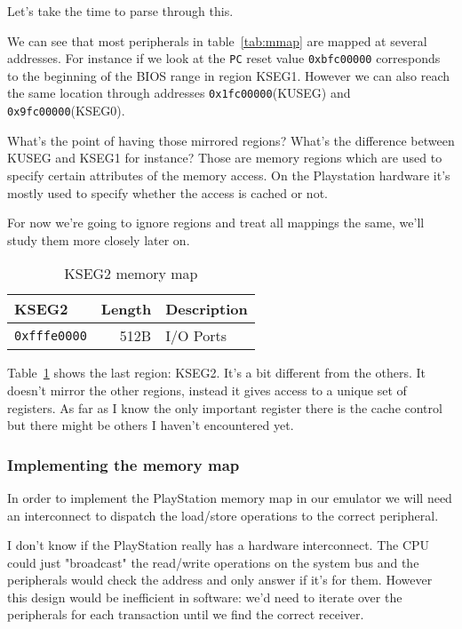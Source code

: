 \documentclass{article}
\begin{document}
Let's take the time to parse through this.

We can see that most peripherals in table~\ref{tab:mmap} are mapped at
several addresses. For instance if we look at the \texttt{PC} reset
value \texttt{0xbfc00000} corresponds to the beginning of the BIOS range in
region KSEG1. However we can also reach the same location through
addresses \texttt{0x1fc00000}(KUSEG) and \texttt{0x9fc00000}(KSEG0).

What's the point of having those mirrored regions? What's the
difference between KUSEG and KSEG1 for instance? Those are memory
regions which are used to specify certain attributes of the memory
access. On the Playstation hardware it's mostly used to specify
whether the access is cached or not.

For now we're going to ignore regions and treat all mappings the same,
we'll study them more closely later on.

\begin{table}[ht]
  \centering

  \begin{tabular}{ l | r | l }
    KSEG2 & Length & Description \\
    \hline
    \texttt{0xfffe0000} & 512B & I/O Ports \\
  \end{tabular}

  \caption{KSEG2 memory map}
  \label{tab:kseg2}
\end{table}

Table~\ref{tab:kseg2} shows the last region: KSEG2. It's a bit
different from the others. It doesn't mirror the other regions,
instead it gives access to a unique set of registers. As far as I know
the only important register there is the cache control but there might
be others I haven't encountered yet.

\subsubsection{Implementing the memory map}

In order to implement the PlayStation memory map in our emulator we
will need an interconnect to dispatch the load/store operations to the
correct peripheral.

I don't know if the PlayStation really has a hardware
interconnect. The CPU could just "broadcast" the read/write operations
on the system bus and the peripherals would check the address and only
answer if it's for them. However this design would be inefficient in
software: we'd need to iterate over the peripherals for each
transaction until we find the correct receiver.
\end{document}
